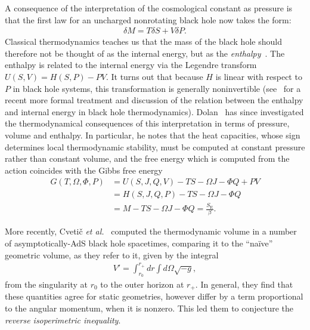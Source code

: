 \documentclass[
twoside,
openright,
frontopenright,
]{dmathesis}
\newcommand{\nn}{\nonumber}
\begin{document}
A consequence of the interpretation of the cosmological constant as pressure is
that the first law for an uncharged nonrotating black hole now takes the form:
\begin{align}
  \delta M = T\delta S + V\delta P.
\end{align}
Classical thermodynamics teaches us that the mass of the black hole should
therefore not be thought of as the internal energy, but as the
\emph{enthalpy}~\cite{Kastor:2009wy}. The enthalpy is related to the internal
energy via the Legendre transform $U(S,V) = H(S,P) - PV$. It turns out that
because $H$ is linear with respect to $P$ in black hole systems, this
transformation is generally noninvertible (see~\cite{Baldiotti:2017ywq} for a
recent more formal treatment and discussion of the relation between the enthalpy
and internal energy in black hole
thermodynamics). Dolan~\cite{Dolan:2010ha,Dolan:2011xt} has since investigated
the thermodynamical consequences of this interpretation in terms of pressure,
volume and enthalpy. In particular, he notes that the heat capacities, whose
sign determines local thermodynamic stability, must be computed at constant
pressure rather than constant volume, and the free energy which is computed from
the action coincides with the Gibbs free energy
\begin{align}
  G(T,\Omega,\Phi,P) &= U(S,J,Q,V) - TS - \Omega J - \Phi Q + PV\nn\\
                     &= H(S,J,Q,P) - TS -\Omega J -\Phi Q\nn\\
                     &= M - TS - \Omega J - \Phi Q = \frac{S_\mathrm{E}}{\beta}.
\end{align}

More recently, Cveti\v c \emph{et al.}~\cite{Cvetic:2010jb} computed the
thermodynamic volume in a number of asymptotically-AdS black hole spacetimes,
comparing it to the ``na\" ive'' geometric volume, as they refer to it, given by
the integral
\begin{align}
  V' = \int_{r_0}^{r_+}dr\int d\Omega \sqrt{-g},
\end{align}
from the singularity at $r_0$ to the outer horizon at $r_+$. In general, they
find that these quantities agree for static geometries, however differ by a term
proportional to the angular momentum, when it is nonzero. This led them to
conjecture the \emph{reverse isoperimetric inequality}.
\end{document}
